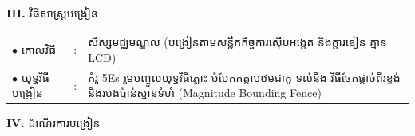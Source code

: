 \documentclass[a4paper,10pt]{article}
\newcommand{\en}[1]{{\TimesEn #1}}
\begin{document}
{\vspace{2pt}

\textbf{III.} {\muol វិធីសាស្រ្តបង្រៀន}\\[1pt]
\hspace*{0.45cm}%
\begin{tabular}{@{}l l L{14.85cm}@{}}
  $\bullet$ \hspace{0.25cm} គោលវិធី & : & សិស្សមជ្ឈមណ្ឌល (បង្រៀនតាមសន្លឹកកិច្ចការស៊ើបអង្កេត និងក្ដារខៀន គ្មាន \en{LCD}) \\
  $\bullet$ \hspace{0.25cm} យុទ្ធវិធីបង្រៀន & : & គំរូ \en{5Es} រួមបញ្ចូលយុទ្ធវិធីភ្លោះ បំបែកកត្តាបឋមជាគូ ទល់នឹង វិធីចែកផ្ដាច់ពីរខ្ទង់ និងរបងប៉ាន់ស្មានទំហំ (\en{Magnitude Bounding Fence}) \\
\end{tabular}
}

\vspace{2pt}

\textbf{IV.} {\muol ដំណើរការបង្រៀន}

\vspace{1pt}
\end{document}
